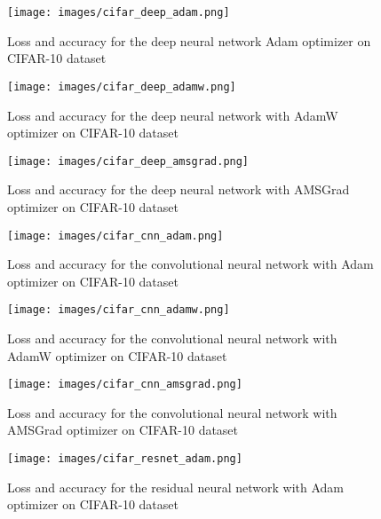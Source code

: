 \documentclass{article} %
\begin{document}
\begin{figure}[h]
\begin{center}
\texttt{[image: images/cifar\_deep\_adam.png]}
\end{center}
\caption{Loss and accuracy for the deep neural network Adam optimizer on CIFAR-10 dataset}
\end{figure}

\begin{figure}[h]
\begin{center}
\texttt{[image: images/cifar\_deep\_adamw.png]}
\end{center}
\caption{Loss and accuracy for the deep neural network with AdamW optimizer on CIFAR-10 dataset}
\end{figure}

\begin{figure}[h]
\begin{center}
\texttt{[image: images/cifar\_deep\_amsgrad.png]}
\end{center}
\caption{Loss and accuracy for the deep neural network with AMSGrad optimizer on CIFAR-10 dataset}
\end{figure}

\begin{figure}[h]
\begin{center}
\texttt{[image: images/cifar\_cnn\_adam.png]}
\end{center}
\caption{Loss and accuracy for the convolutional neural network with Adam optimizer on CIFAR-10 dataset}
\end{figure}

\begin{figure}[h]
\begin{center}
\texttt{[image: images/cifar\_cnn\_adamw.png]}
\end{center}
\caption{Loss and accuracy for the convolutional neural network with AdamW optimizer on CIFAR-10 dataset}
\end{figure}

\begin{figure}[h]
\begin{center}
\texttt{[image: images/cifar\_cnn\_amsgrad.png]}
\end{center}
\caption{Loss and accuracy for the convolutional neural network with AMSGrad optimizer on CIFAR-10 dataset}
\end{figure}

\begin{figure}[h]
\begin{center}
\texttt{[image: images/cifar\_resnet\_adam.png]}
\end{center}
\caption{Loss and accuracy for the residual neural network with Adam optimizer on CIFAR-10 dataset}
\end{figure}
\end{document}
